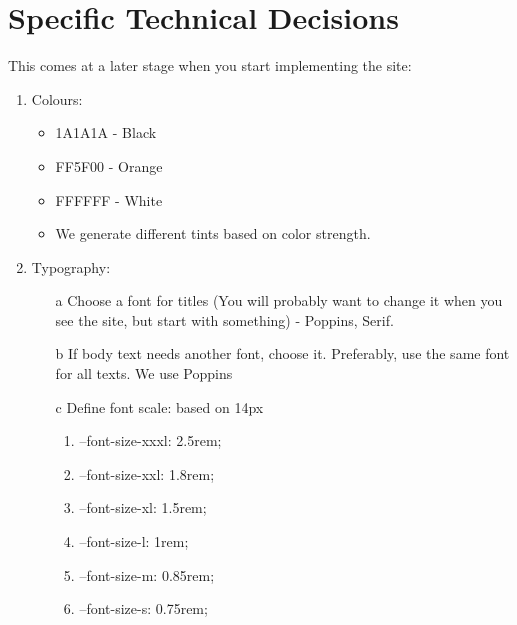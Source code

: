 \documentclass{article}
\begin{document}
\section{Specific Technical Decisions }
This comes at a later stage when you start implementing the site:
\begin{enumerate}
    \item Colours:
    \begin{itemize}
        \item 1A1A1A - Black
        \item FF5F00 - Orange
        \item FFFFFF - White
        \item We generate different tints based on color strength.
    \end{itemize}
    \item Typography:
    \begin{enumerate}
        \item[a] Choose a font for titles (You will probably want to change it when you see the site, but
start with something) - Poppins, Serif.
        \item[b] If body text needs another font, choose it. Preferably, use the same font for all texts.
        We use Poppins
        \item[c] Define font scale: based on 14px
        \begin{enumerate}
            \item           --font-size-xxxl: 2.5rem; 
         \item --font-size-xxl: 1.8rem;
                 \item  --font-size-xl: 1.5rem;
                 \item --font-size-l: 1rem;
                 \item --font-size-m: 0.85rem;
                \item  --font-size-s: 0.75rem;
        \end{enumerate}


\end{enumerate}
\end{enumerate}
\end{document}
